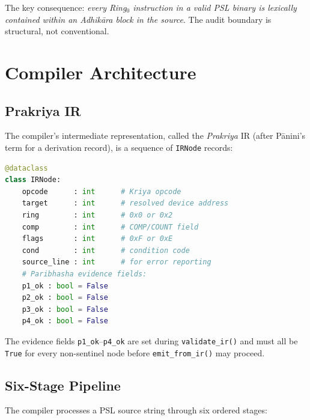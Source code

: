 \documentclass[11pt,a4paper]{article}
\begin{document}
The key consequence: \emph{every Ring$_0$ instruction in a valid PSL binary
is lexically contained within an Adhi\-k\={a}ra block in the source}. The
audit boundary is structural, not conventional.

\section{Compiler Architecture}
\label{sec:compiler}

\subsection{Prakriya IR}

The compiler's intermediate representation, called the \emph{Prakriya} IR
(after P\={a}nini's term for a derivation record), is a sequence of
\texttt{IRNode} records:

\begin{lstlisting}[language=Python, caption={IRNode dataclass (Python).}]
@dataclass
class IRNode:
    opcode      : int      # Kriya opcode
    target      : int      # resolved device address
    ring        : int      # 0x0 or 0x2
    comp        : int      # COMP/COUNT field
    flags       : int      # 0xF or 0xE
    cond        : int      # condition code
    source_line : int      # for error reporting
    # Paribhasha evidence fields:
    p1_ok : bool = False
    p2_ok : bool = False
    p3_ok : bool = False
    p4_ok : bool = False
\end{lstlisting}

The evidence fields \texttt{p1\_ok}--\texttt{p4\_ok} are set during
\texttt{validate\_ir()} and must all be \texttt{True} for every
non-sentinel node before \texttt{emit\_from\_ir()} may proceed.

\subsection{Six-Stage Pipeline}

The compiler processes a PSL source string through six ordered stages:
\end{document}
